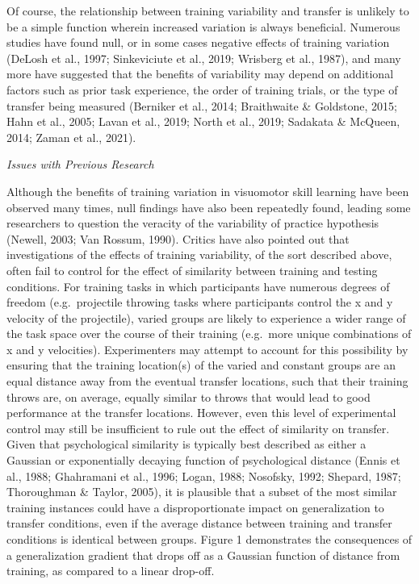 \documentclass[
  man,floatsintext]{apa7}
\begin{document}
Of course, the relationship between training variability and transfer is unlikely to be a simple function wherein increased variation is always beneficial. Numerous studies have found null, or in some cases negative effects of training variation (DeLosh et al., 1997; Sinkeviciute et al., 2019; Wrisberg et al., 1987), and many more have suggested that the benefits of variability may depend on additional factors such as prior task experience, the order of training trials, or the type of transfer being measured (Berniker et al., 2014; Braithwaite \& Goldstone, 2015; Hahn et al., 2005; Lavan et al., 2019; North et al., 2019; Sadakata \& McQueen, 2014; Zaman et al., 2021).

\emph{Issues with Previous Research}

Although the benefits of training variation in visuomotor skill learning have been observed many times, null findings have also been repeatedly found, leading some researchers to question the veracity of the variability of practice hypothesis (Newell, 2003; Van Rossum, 1990). Critics have also pointed out that investigations of the effects of training variability, of the sort described above, often fail to control for the effect of similarity between training and testing conditions. For training tasks in which participants have numerous degrees of freedom (e.g.~projectile throwing tasks where participants control the x and y velocity of the projectile), varied groups are likely to experience a wider range of the task space over the course of their training (e.g.~more unique combinations of x and y velocities). Experimenters may attempt to account for this possibility by ensuring that the training location(s) of the varied and constant groups are an equal distance away from the eventual transfer locations, such that their training throws are, on average, equally similar to throws that would lead to good performance at the transfer locations. However, even this level of experimental control may still be insufficient to rule out the effect of similarity on transfer. Given that psychological similarity is typically best described as either a Gaussian or exponentially decaying function of psychological distance (Ennis et al., 1988; Ghahramani et al., 1996; Logan, 1988; Nosofsky, 1992; Shepard, 1987; Thoroughman \& Taylor, 2005), it is plausible that a subset of the most similar training instances could have a disproportionate impact on generalization to transfer conditions, even if the average distance between training and transfer conditions is identical between groups. Figure 1 demonstrates the consequences of a generalization gradient that drops off as a Gaussian function of distance from training, as compared to a linear drop-off.
\end{document}
